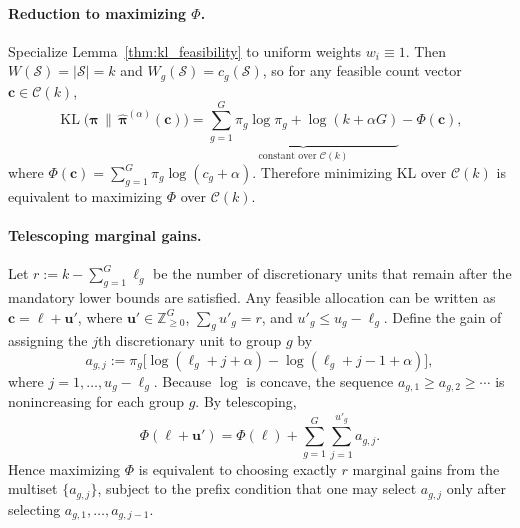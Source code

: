 \documentclass[10pt,journal]{IEEEtran}
\newcommand{\1}{\mathbf{1}}
\newcommand{\bc}{\mathbf{c}}
\newcommand{\bpi}{\boldsymbol{\pi}}
\newcommand{\Sel}{\mathcal{S}}
\DeclareMathOperator{\KL}{KL}
\theoremstyle{ieeethm}
\begin{document}
\paragraph{Reduction to maximizing $\Phi$.}
Specialize Lemma~\ref{thm:kl_feasibility} to uniform weights $w_i\equiv 1$. Then $W(\Sel)=|\Sel|=k$ and $W_g(\Sel)=c_g(\Sel)$, so for any feasible count vector $\bc\in\mathcal{C}(k)$,
\[
\KL\!\big(\bpi\,\big\|\,\widehat{\bpi}^{(\alpha)}(\bc)\big)
=
\underbrace{\sum_{g=1}^{G}\pi_g\log\pi_g + \log(k+\alpha G)}_{\text{constant over }\mathcal{C}(k)}
-
\Phi(\bc),
\]
where $\Phi(\bc)=\sum_{g=1}^{G}\pi_g\log(c_g+\alpha)$. Therefore minimizing KL over $\mathcal{C}(k)$ is equivalent to maximizing $\Phi$ over $\mathcal{C}(k)$.

\paragraph{Telescoping marginal gains.}
Let $r := k-\sum_{g=1}^{G}\ell_g$ be the number of discretionary units that remain after the mandatory lower bounds are satisfied. Any feasible allocation can be written as $\bc=\boldsymbol{\ell}+\mathbf{u}'$, where $\mathbf{u}'\in\mathbb{Z}_{\ge 0}^G$, $\sum_g u'_g=r$, and $u'_g\le u_g-\ell_g$. Define the gain of assigning the $j$th discretionary unit to group $g$ by
\[
a_{g,j}
:=
\pi_g\Big[\log(\ell_g+j+\alpha)-\log(\ell_g+j-1+\alpha)\Big],
\]
where $j=1,\dots,u_g-\ell_g$. Because $\log$ is concave, the sequence $a_{g,1}\ge a_{g,2}\ge\cdots$ is nonincreasing for each group $g$. By telescoping,
\[
\Phi(\boldsymbol{\ell}+\mathbf{u}')
=
\Phi(\boldsymbol{\ell})+
\sum_{g=1}^{G}\sum_{j=1}^{u'_g} a_{g,j}.
\]
Hence maximizing $\Phi$ is equivalent to choosing exactly $r$ marginal gains from the multiset $\{a_{g,j}\}$, subject to the prefix condition that one may select $a_{g,j}$ only after selecting $a_{g,1},\dots,a_{g,j-1}$.
\end{document}
